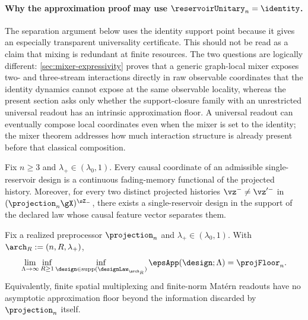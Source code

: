\paragraph{Why the approximation proof may use $\reservoirUnitary_n=\identity$.}
The separation argument below uses the identity support point because it gives
an especially transparent universality certificate.  This should not be read
as a claim that mixing is redundant at finite resources.  The two questions
are logically different: \cref{sec:mixer-expressivity} proves that a generic
graph-local mixer exposes two- and three-stream interactions directly in raw
observable coordinates that the identity dynamics cannot expose at the same
observable locality, whereas the present section asks only whether the
support-closure family with an unrestricted universal readout has an intrinsic
approximation floor.  A universal readout can eventually compose local
coordinates even when the mixer is set to the identity; the mixer theorem
addresses how much interaction structure is already present before that
classical composition.

\begin{lemma}
\label{lem:feature-map-separation}
Fix $n\geq3$ and $\lambda_+\in(\lambda_0,1)$.  Every causal coordinate of an
admissible single-reservoir design is a continuous fading-memory functional of
the projected history.  Moreover, for every two distinct projected histories
$\vz^-\neq\vz'^{-}$ in $(\projection_n\gX)^{\sZ_-}$, there exists a
single-reservoir design in the support of the declared law whose causal
feature vector separates them.
\end{lemma}

\begin{theorem}
\label{thm:width-resolved-approximation}
Fix a realized preprocessor $\projection_n$ and
$\lambda_+\in(\lambda_0,1)$.  With
$\arch_R:=(n,R,\lambda_+)$,
\begin{equation}
    \lim_{\Lambda\to\infty}
      \inf_{R\geq1}
      \inf_{\design\in\operatorname{supp}(\designLaw_{\arch_R})}
      \epsApp(\design;\Lambda)
    =\projFloor_n.
    \label{eq:width-resolved-envelope}
\end{equation}
Equivalently, finite spatial multiplexing and finite-norm Mat\'ern readouts
have no asymptotic approximation floor beyond the information discarded by
$\projection_n$ itself.
\end{theorem}

